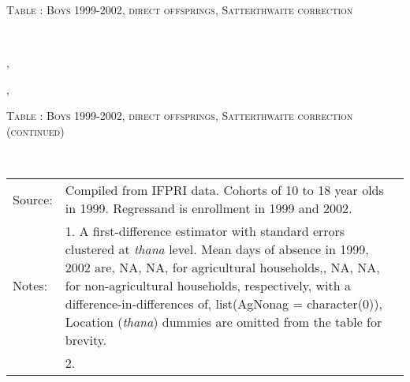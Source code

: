 \begin{table}\hfil\textsc{\footnotesize Table \thetable: Boys 1999-2002, direct offsprings, Satterthwaite correction\label{zEm.1999.10.sameN}}\\\setlength{\tabcolsep}{1pt}\renewcommand{\arraystretch}{.675}\hspace{-2em}\hfil{}\\\renewcommand{\arraystretch}{1}\end{table}, \addtocounter{table}{-1}, \begin{table}\hfil\textsc{\footnotesize Table \thetable: Boys 1999-2002, direct offsprings, Satterthwaite correction (continued)\label{zEm.1999.10.sameN}}\\\setlength{\tabcolsep}{1pt}\renewcommand{\arraystretch}{.675}\hspace{-2em}\hfil{}\\\renewcommand{\arraystretch}{1}\hfil\begin{tabular}{>{\hfill\scriptsize}p{1cm}<{}>{\scriptsize}p{12cm}<{\hfill}} Source:& Compiled from IFPRI data. Cohorts of 10 to 18 year olds in 1999. Regressand is enrollment in 1999 and 2002. \\[-1ex] Notes:& 1. A first-difference estimator with standard errors clustered at \textit{thana} level. Mean days of absence in 1999, 2002 are, NA, NA, for agricultural households,, NA, NA, for non-agricultural households, respectively, with a difference-in-differences of, list(AgNonag = character(0)), Location (\textit{thana}) dummies are omitted from the table for brevity. \\ & 2.   \end{tabular} \end{table}

